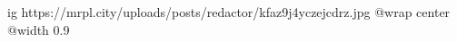  
 
 
 
 

\ifcmt
  ig https://mrpl.city/uploads/posts/redactor/kfaz9j4yczejcdrz.jpg
  @wrap center
  @width 0.9
\fi

